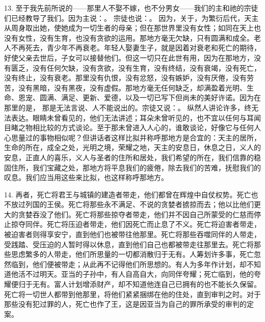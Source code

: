 13. 至于我先前所说的——那里人不娶不嫁，也不分男女——我们的主和祂的宗徒们已经教导了我们。因为主说：。 宗徒也说：。 因为，关于，为繁衍后代，天主从周身取出她，使她成为一切生者的母亲；但在那世界里没有女性；如同在天上也没有女性，没有生育，也没有贪欲的运用。那地方毫无欠缺，只有圆满和成全。老人不再死去，青少年不再衰老。年轻人娶妻生子，就是因着对衰老和死亡的期待，好使父亲去世后，子女可以接替他们。但这一切只在此世有用，因为在那地方，没有匮乏，没有任何欠缺，没有贪欲，没有生育，没有终结，没有衰竭，没有死亡，没有终止，没有衰老。那里没有仇恨，没有忿怒，没有嫉妒，没有厌倦，没有劳苦，没有黑暗，没有黑夜，没有虚假。那地方毫无任何缺乏，却满盈着光明、生命、恩宠、圆满、满足、更新、爱德，以及一切已写下但尚未的美好许诺。因为在那里的是， 那是无法言说、人不能说出的。宗徒又说：。 纵然人讲论许多，终无法表达。眼睛未曾看见的，他们无法讲述；耳朵未曾听见的，也不宜以任何与耳闻目睹之物相比较的方式谈论。至于那未曾进入人心的，谁敢谈论，好像它与任何人心思量过的事物相似呢？但讲话者这样比拟并称呼那地方是合宜的：天主的居所，生命的所在，成全之处，光明之境，荣耀之地，天主的安息日，休息之日，义人的安息，正直人的喜乐，义人与圣者的住所和居处，我们希望的所在，我们信靠的稳固住所，我们宝藏之处，那地方将平息我们的疲倦，除去我们的苦难，抚慰我们的叹息。我们应当用这些来比拟，也这样称呼那地方。\par

14. 再者，死亡将君王与城镇的建造者带走，他们都曾在辉煌中自仗权势。死亡也不放过列国的王侯。死亡将那些永不满足、不说的贪婪者掳掠而去；他以比他们更大的贪婪吞没了他们。死亡将那些掠夺者带走，他们并不因自己所蒙受的仁慈而停止掠夺同伴。死亡将压迫者带走，他们因死亡而止息了不义。死亡将迫害者带走，被迫害者则得享安宁，直到他们也被带往他那里。死亡将那些吞噬同伴的人带走，受践踏、受压迫的人暂时得以休息，直到他们自己也都被带走往那里去。死亡将那些思虑繁多的人带走，他们所思量的一切都消散归于无有。人筹划许多事，死亡忽然临到，他们便被带走；从此再不记得他们所思想的。有人为多年作计划，却不知道他活不过明天。亚当的子孙中，有人自高自大，向同伴夸耀；死亡临到，他的夸耀便归于无有。富人计划增添财产，却不知道他连自己已拥有的也不能长久保留。死亡将一切世人都带到他那里，将他们紧紧捆绑在他的住处，直到审判之时。对于那些没有犯过罪的人，死亡也作了王，这是因亚当为自己的罪所承受的审判的定案。\par

